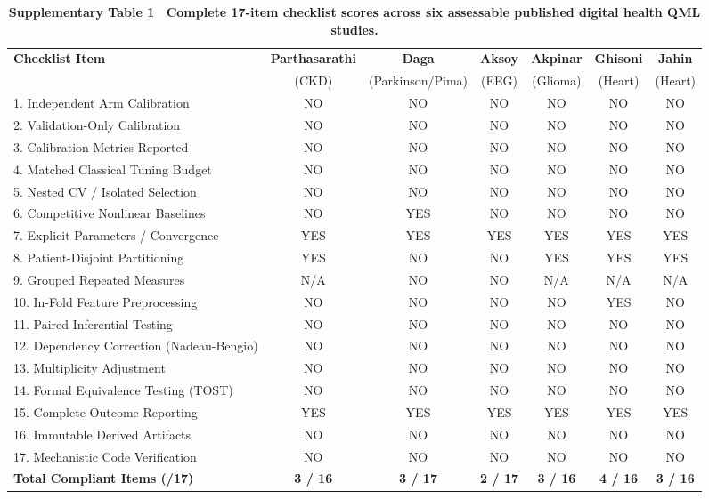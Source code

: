 \documentclass[10pt,a4paper]{article}
\begin{document}
\begin{table}[h]
\centering
\scriptsize
\caption*{\textbf{\textsf{Supplementary Table 1 \textbar\ Complete 17-item checklist scores across six assessable published digital health QML studies.}}}
\begin{tabular}{lcccccc}
\toprule
\textbf{Checklist Item} & \textbf{Parthasarathi} & \textbf{Daga} & \textbf{Aksoy} & \textbf{Akpinar} & \textbf{Ghisoni} & \textbf{Jahin} \\
& (CKD) & (Parkinson/Pima) & (EEG) & (Glioma) & (Heart) & (Heart) \\
\midrule
1. Independent Arm Calibration & NO & NO & NO & NO & NO & NO \\
2. Validation-Only Calibration & NO & NO & NO & NO & NO & NO \\
3. Calibration Metrics Reported & NO & NO & NO & NO & NO & NO \\
4. Matched Classical Tuning Budget & NO & NO & NO & NO & NO & NO \\
5. Nested CV / Isolated Selection & NO & NO & NO & NO & NO & NO \\
6. Competitive Nonlinear Baselines & NO & YES & NO & NO & NO & NO \\
7. Explicit Parameters / Convergence & YES & YES & YES & YES & YES & YES \\
8. Patient-Disjoint Partitioning & YES & NO & NO & YES & YES & YES \\
9. Grouped Repeated Measures & N/A & NO & NO & N/A & N/A & N/A \\
10. In-Fold Feature Preprocessing & NO & NO & NO & NO & YES & NO \\
11. Paired Inferential Testing & NO & NO & NO & NO & NO & NO \\
12. Dependency Correction (Nadeau-Bengio) & NO & NO & NO & NO & NO & NO \\
13. Multiplicity Adjustment & NO & NO & NO & NO & NO & NO \\
14. Formal Equivalence Testing (TOST) & NO & NO & NO & NO & NO & NO \\
15. Complete Outcome Reporting & YES & YES & YES & YES & YES & YES \\
16. Immutable Derived Artifacts & NO & NO & NO & NO & NO & NO \\
17. Mechanistic Code Verification & NO & NO & NO & NO & NO & NO \\
\midrule
\textbf{Total Compliant Items (/17)} & \textbf{3 / 16} & \textbf{3 / 17} & \textbf{2 / 17} & \textbf{3 / 16} & \textbf{4 / 16} & \textbf{3 / 16} \\
\bottomrule
\end{tabular}
\end{table}
\end{document}
